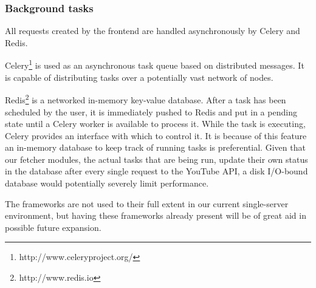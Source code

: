 \subsubsection{Background tasks}
All requests created by the frontend are handled asynchronously by Celery and
Redis.

Celery\footnote{http://www.celeryproject.org/} is used as an asynchronous task
queue based on distributed messages. It is capable of distributing tasks over a
potentially vast network of nodes.

Redis\footnote{http://www.redis.io} is a networked in-memory key-value database.
After a task has been scheduled by the user, it is immediately pushed to Redis
and put in a pending state until a Celery worker is available to process it.
While the task is executing, Celery provides an interface with which to control
it. It is because of this feature an in-memory database to keep track of running
tasks is preferential. Given that our fetcher modules, the actual tasks that are
being run, update their own status in the database after every single request to
the YouTube API, a disk I/O-bound database would potentially severely limit
performance.

The frameworks are not used to their full extent in our current single-server
environment, but having these frameworks already present will be of great aid in
possible future expansion. 


